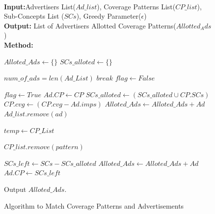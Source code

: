 \begin{figure}
\hrulefill
\caption{Algorithm to Match Coverage Patterns and Advertisements}
\hrulefill
\\
\label{Matching Algorithm}
\textbf{Input:}Advertisers List($Ad\_list$), Coverage Patterns List($CP\_list$), Sub-Concepts List ($SCs$), Greedy Parameter($\epsilon$) \\
\textbf{Output:}  List of Advertisers Allotted Coverage Patterns($Allotted_Ads$)\\
\textbf{Method:} 
\begin{algorithmic}[1]
    \STATE $Alloted\_Ads \gets \{\}$
    \STATE $SCs\_alloted \gets \{\}$
	
		\STATE $num\_of\_ads = len(Ad\_List)$
		    $break$
    	\ENDIF
    	\STATE $flag \gets False$
	
			\STATE $flag \gets True$
			\STATE $Ad.CP \gets CP$
			\STATE $SCs\_alloted \gets (SCs\_alloted \cup CP.SCs) $
			\STATE $CP.cvg \gets (CP.cvg - Ad.imps)$
			\STATE $Alloted\_Ads \gets Alloted\_Ads +Ad$		
			\STATE $Ad\_list.remove(ad)$
		\ENDIF	
    \ENDFOR
    
   \STATE $temp \gets CP\_List$

    			\STATE $CP\_list.remove(pattern)$
    		\ENDIF
    	\ENDFOR
    \ENDIF
    \ENDFOR
 
    
    
    
	\STATE $SCs\_left \gets SCs - SCs\_alloted$
		\STATE $Alloted\_Ads \gets Alloted\_Ads + Ad$
		\STATE $Ad.CP \gets SCs\_left$
	\ENDFOR
\ENDIF


\STATE Output $Alloted\_Ads$.
\end{algorithmic}
\hrulefill
\end{figure}





